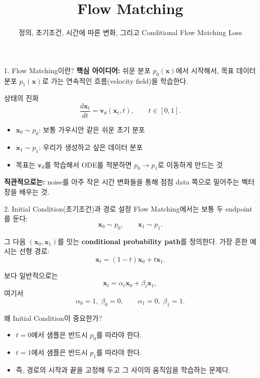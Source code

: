 \documentclass[aspectratio=169,11pt]{beamer}
\title{Flow Matching}
\subtitle{정의, 초기조건, 시간에 따른 변화, 그리고 Conditional Flow Matching Loss}
\author{}
\date{}
\newcommand{\vx}{\mathbf{x}}
\newcommand{\vv}{\mathbf{v}}
\begin{document}
\begin{frame}
  \titlepage
\end{frame}

\begin{frame}{1. Flow Matching이란?}
\small
\textbf{핵심 아이디어:} 쉬운 분포 $p_0(\vx)$에서 시작해서, 목표 데이터 분포 $p_1(\vx)$로 가는
\alert{연속적인 흐름(velocity field)}을 학습한다.

\vspace{0.5em}
\begin{block}{상태의 진화}
\[
\frac{d\vx_t}{dt} = \vv_\theta(\vx_t, t), \qquad t \in [0,1].
\]
\end{block}

\begin{itemize}
  \item $\vx_0 \sim p_0$: 보통 가우시안 같은 쉬운 초기 분포
  \item $\vx_1 \sim p_1$: 우리가 생성하고 싶은 데이터 분포
  \item 목표는 $\vv_\theta$를 학습해서 ODE를 적분하면 $p_0 \to p_1$로 이동하게 만드는 것
\end{itemize}

\vspace{0.4em}
\textbf{직관적으로는:} noise를 아주 작은 시간 변화들을 통해 점점 data 쪽으로 밀어주는 벡터장을 배우는 것.
\end{frame}

\begin{frame}{2. Initial Condition(초기조건)과 경로 설정}
\small
Flow Matching에서는 보통 두 endpoint를 둔다:
\[
\vx_0 \sim p_0, \qquad \vx_1 \sim p_1.
\]

그 다음 $(\vx_0, \vx_1)$를 잇는 \textbf{conditional probability path}를 정의한다. 가장 흔한 예시는 선형 경로:
\[
\vx_t = (1-t)\vx_0 + t\vx_1.
\]

보다 일반적으로는
\[
\vx_t = \alpha_t \vx_0 + \beta_t \vx_1,
\]
여기서
\[
\alpha_0 = 1,\; \beta_0 = 0, \qquad \alpha_1 = 0,\; \beta_1 = 1.
\]

\begin{block}{왜 Initial Condition이 중요한가?}
\begin{itemize}
  \item $t=0$에서 샘플은 반드시 $p_0$를 따라야 한다.
  \item $t=1$에서 샘플은 반드시 $p_1$를 따라야 한다.
  \item 즉, 경로의 시작과 끝을 고정해 두고 그 사이의 움직임을 학습하는 문제다.
\end{itemize}
\end{block}
\end{frame}
\end{document}
